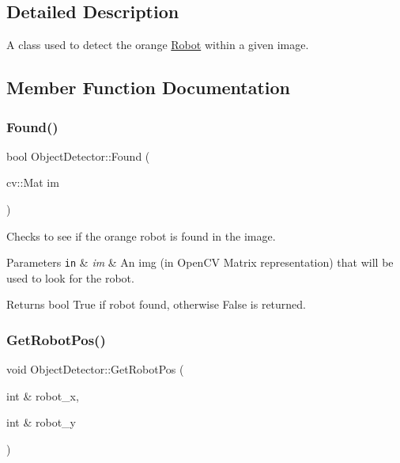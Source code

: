\subsection{Detailed Description}
A class used to detect the orange \hyperlink{classRobot}{Robot} within a given image. 

\subsection{Member Function Documentation}
\mbox{\label{classObjectDetector_a55190dc7b44f92778ef0dc0e7f9fea84}} 
\subsubsection{\texorpdfstring{Found()}{Found()}}
{\footnotesize\ttfamily bool Object\+Detector\+::\+Found (\begin{DoxyParamCaption}\item[{cv\+::\+Mat}]{im }\end{DoxyParamCaption})}



Checks to see if the orange robot is found in the image. 


\begin{DoxyParams}[1]{Parameters}
\mbox{\tt in}  & {\em im} & An img (in Open\+CV Matrix representation) that will be used to look for the robot.\\
\hline
\end{DoxyParams}
\begin{DoxyReturn}{Returns}
bool True if robot found, otherwise False is returned. 
\end{DoxyReturn}
\mbox{\label{classObjectDetector_a64e8323f779d53b5d957a1b533624440}} 
\subsubsection{\texorpdfstring{Get\+Robot\+Pos()}{GetRobotPos()}}
{\footnotesize\ttfamily void Object\+Detector\+::\+Get\+Robot\+Pos (\begin{DoxyParamCaption}\item[{int \&}]{robot\+\_\+x,  }\item[{int \&}]{robot\+\_\+y }\end{DoxyParamCaption})}




